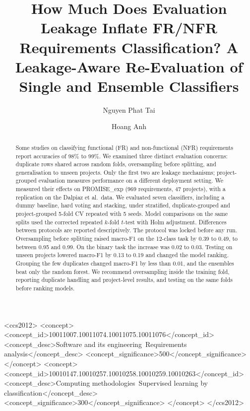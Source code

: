 \documentclass[sigconf]{acmart}
\begin{document}
\title[Evaluation Leakage in FR/NFR Requirements Classification]{How Much Does Evaluation Leakage Inflate FR/NFR Requirements Classification? A Leakage-Aware Re-Evaluation of Single and Ensemble Classifiers}

\author{Nguyen Phat Tai}

\author{Hoang Anh}

\renewcommand{\shortauthors}{Nguyen et al.}

\begin{abstract}
Some studies on classifying functional (FR) and non-functional (NFR) requirements report accuracies of 98\% to 99\%. We examined three distinct evaluation concerns: duplicate rows shared across random folds, oversampling before splitting, and generalisation to unseen projects. Only the first two are leakage mechanisms; project-grouped evaluation measures performance on a different deployment setting. We measured their effects on PROMISE\_exp (969 requirements, 47 projects), with a replication on the Dalpiaz et al.\ data. We evaluated seven classifiers, including a dummy baseline, hard voting and stacking, under stratified, duplicate-grouped and project-grouped 5-fold CV repeated with 5 seeds. Model comparisons on the same splits used the corrected repeated $k$-fold $t$-test with Holm adjustment. Differences between protocols are reported descriptively. The protocol was locked before any run. Oversampling before splitting raised macro-F1 on the 12-class task by 0.39 to 0.49, to between 0.95 and 0.99. On the binary task the increase was 0.02 to 0.03. Testing on unseen projects lowered macro-F1 by 0.13 to 0.19 and changed the model ranking. Grouping the few duplicates changed macro-F1 by less than 0.01, and the ensembles beat only the random forest. We recommend oversampling inside the training fold, reporting duplicate handling and project-level results, and testing on the same folds before ranking models.
\end{abstract}

\begin{CCSXML}
<ccs2012>
 <concept>
  <concept_id>10011007.10011074.10011075.10011076</concept_id>
  <concept_desc>Software and its engineering~Requirements analysis</concept_desc>
  <concept_significance>500</concept_significance>
 </concept>
 <concept>
  <concept_id>10010147.10010257.10010258.10010259.10010263</concept_id>
  <concept_desc>Computing methodologies~Supervised learning by classification</concept_desc>
  <concept_significance>300</concept_significance>
 </concept>
</ccs2012>
\end{CCSXML}
\end{document}
